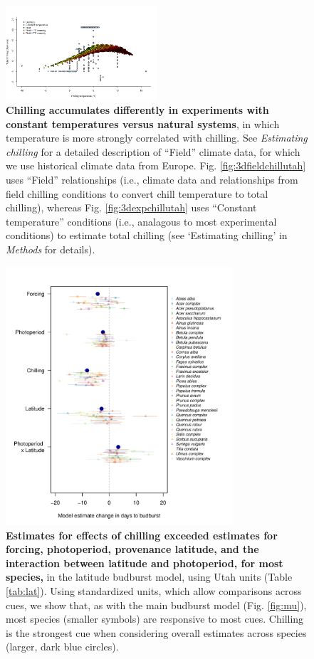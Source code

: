 \documentclass{article}
\begin{document}
\begin{figure}[h!]
\centering
\noindent \includegraphics[width=0.50\textwidth]{..//..//analyses/bb_analysis/figures/EDFig4_exp_vs_field_chill_withwarmingcols.png}
\caption{\textbf{Chilling accumulates differently in experiments with constant temperatures versus natural systems}, in which temperature is more strongly correlated with chilling. See \emph{Estimating chilling} for a detailed description of ``Field'' climate data, for which we use historical climate data from Europe. Fig. \ref{fig:3dfieldchillutah} uses ``Field'' relationships (i.e., climate data and relationships from field chilling conditions to convert chill temperature to total chilling), whereas Fig. \ref{fig:3dexpchillutah} uses ``Constant temperature'' conditions (i.e., analagous to most experimental conditions) to estimate total chilling (see `Estimating chilling' in \emph{Methods} for details).}
\label{fig:chillexpfield}
\end{figure}

\begin{figure}[h!]
\centering
\noindent \includegraphics[width=0.75\textwidth]{..//..//analyses/lat_analysis/figures/EDFig5_latanalysis_spcom_expramp_fp.pdf}
\caption{\textbf{Estimates for effects of chilling exceeded estimates for forcing, photoperiod, provenance latitude, and the interaction between latitude and photoperiod, for most species,} in the latitude budburst model, using Utah units (Table \ref{tab:lat}). Using standardized units, which allow comparisons across cues, we show that, as with the main budburst model (Fig. \ref{fig:mu}), most species (smaller symbols) are responsive to most cues. Chilling is the strongest cue when considering overall estimates across species (larger, dark blue circles).}
\label{fig:lat}
\end{figure}
\end{document}
